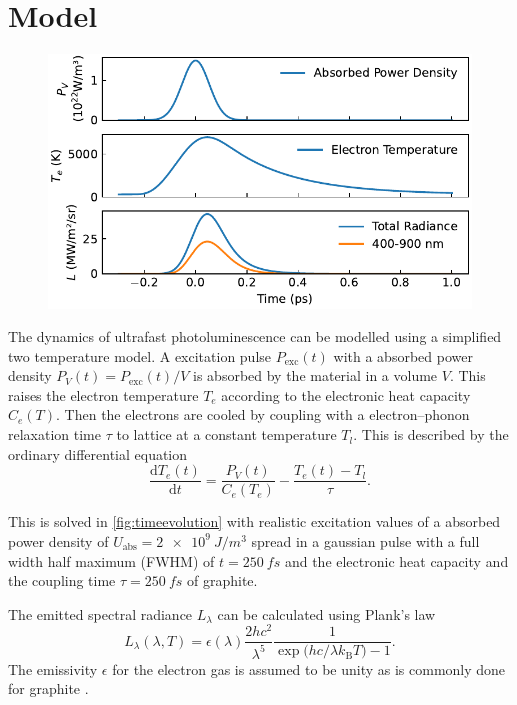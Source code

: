 \documentclass[
	a4paper,
]{scrarticle}
\begin{document}
\section{Model}
\begin{figure}[b]
    \centering
    \includegraphics{../analysis/figures/model.time_evolution.pdf}
    \caption{}
    \label{fig:timeevolution}
\end{figure}
The dynamics of ultrafast photoluminescence can be modelled using a simplified two temperature model. 
A excitation pulse $P_\text{exc}(t)$ with a absorbed power density $P_V(t) = P_\text{exc}(t) / V$ is absorbed by the material in a volume $V$.
This raises the electron temperature $T_e$ according to the electronic heat capacity $C_e(T)$. 
Then the electrons are cooled by coupling with a electron–phonon relaxation time $\tau$ to lattice at a constant temperature $T_l$.
This is described by the ordinary differential equation
\begin{equation}
    \frac{\mathrm d T_e(t)}{\mathrm d t}
    =
    \frac{P_V(t)}{C_e(T_e)}
    -\frac{T_e(t) - T_l}{\tau}.
    \label{eq:Te}
\end{equation}

This is solved in \autoref{fig:timeevolution} with realistic excitation values of a absorbed power density of $U_\text{abs} = \SI{2e9}{J/m^3}$ spread in a gaussian pulse with a full width half maximum (FWHM) of $t=\SI{250}{fs}$ and the electronic heat capacity \cite{nihiraTemperatureDependenceLattice2003} and the coupling time $\tau=\SI{250}{fs}$ \cite{stangeHotElectronCooling2015} of graphite.



The emitted spectral radiance $L_\lambda$ can be calculated using Plank's law
\begin{equation}
    L_\lambda(\lambda,T)
    = \epsilon(\lambda) \frac{2hc^{2}}{\lambda^{5}}
    \frac{1}{\exp\bigl(hc / \lambda k_{\mathrm B}T\bigr)-1}.
\end{equation}
The emissivity $\epsilon$ for the electron gas is assumed to be unity as is commonly done for graphite \cite{sapritskyBlackbodyRadiometry1995}.
\end{document}
